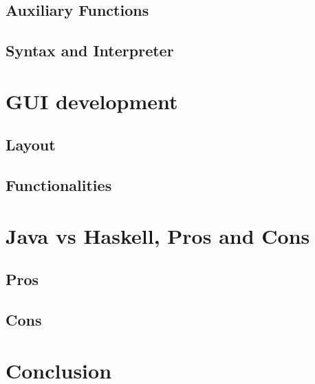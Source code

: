\documentclass[a4paper,11pt,twoside]{report}
\begin{document}
\section{Auxiliary Functions}

\section{Syntax and Interpreter}

\chapter{GUI development}

\section{Layout}

\section{Functionalities}

\chapter{Java vs Haskell, Pros and Cons}

\section{Pros}

\section{Cons}

\chapter{Conclusion}




\end{document}
